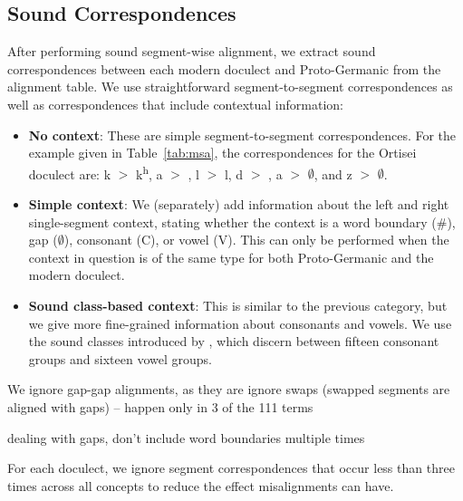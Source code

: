 \documentclass[a4paper]{article}
\begin{document}
\subsection{Sound Correspondences}

After performing sound segment-wise alignment,
we extract sound correspondences between each
modern doculect and Proto-Germanic from the alignment table.
We use straightforward segment-to-segment correspondences
as well as correspondences that include contextual information:

\begin{itemize}
\item
\textbf{No context}:
These are simple segment-to-segment correspondences.
For the example given in Table~\ref{tab:msa},
the correspondences for the Ortisei doculect are:
k $>$ k\textsuperscript{h}, a $>$ \textopeno, l $>$ l, d $>$ , a $>$ $\emptyset$, and z $>$ $\emptyset$.

\item
\textbf{Simple context}:
We (separately) add information about the
left and right single-segment context,
stating whether the context is a
word boundary (\#), gap ($\emptyset$), consonant (C), or vowel (V). 
This can only be performed when the context in question is of
the same type for both Proto-Germanic and the modern doculect.

\item
\textbf{Sound class-based context}:
This is similar to the previous category,
but we give more fine-grained information about consonants and vowels.
We use the sound classes introduced by \citet{list2012sca},
which discern between fifteen consonant groups and sixteen vowel groups.

\end{itemize}


We ignore gap-gap alignments, as they are 
ignore swaps (swapped segments are aligned with gaps) -- happen only in 3 of the 111 terms

dealing with gaps, don't include word boundaries multiple times

For each doculect, we ignore segment correspondences that occur less than three times across all concepts to reduce the effect misalignments can have.
\end{document}

